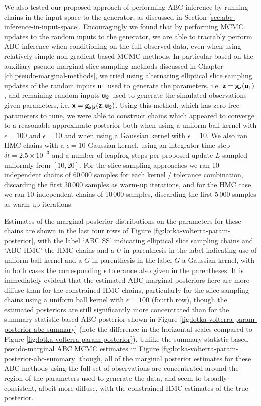 We also tested our proposed approach of performing \ac{ABC} inference by running chains in the input space to the generator, as discussed in Section \ref{sec:abc-inference-in-input-space}. Encouragingly we found that by performing \ac{MCMC} updates to the random inputs to the generator, we are able to tractably perform \ac{ABC} inference when conditioning on the full observed data, even when using relatively simple non-gradient based \ac{MCMC} methods. In particular based on the auxiliary pseudo-marginal slice sampling methods discussed in Chapter \ref{ch:pseudo-marginal-methods}, we tried using alternating elliptical slice sampling updates of the random inputs $\boldsymbol{\mathsf{u}}_1$ used to generate the parameters, i.e. $\boldsymbol{\mathsf{z}} = {\mathbf{g}}_{\boldsymbol{\mathsf{z}}}(\boldsymbol{\mathsf{u}}_1)$, and remaining random inputs $\boldsymbol{\mathsf{u}}_2$ used to generate the simulated observations given parameters, i.e. $\boldsymbol{\mathsf{x}} = {\mathbf{g}}_{\boldsymbol{\mathsf{x}}|\boldsymbol{\mathsf{z}}}(\boldsymbol{\mathsf{z}},\boldsymbol{\mathsf{u}}_2)$. Using this method, which has zero free parameters to tune, we were able to construct chains which appeared to converge to a reasonable approximate posterior both when using a uniform ball kernel with $\epsilon=100$ and $\epsilon=10$ and when using a Gaussian kernel with $\epsilon=10$. We also ran \ac{HMC} chains with a $\epsilon=10$ Gaussian kernel, using an integrator time step $\delta t = 2.5 \times 10^{-3}$ and a number of leapfrog steps per proposed update $L$ sampled uniformly from $[10, 20]$. For the slice sampling approaches we ran 10 independent chains of 60\,000 samples for each kernel / tolerance combination, discarding the first 30\,000 samples as warm-up iterations, and for the \ac{HMC} case we ran 10 independent chains of 10\,000 samples, discarding the first 5\,000 samples as warm-up iterations.

Estimates of the marginal posterior distributions on the parameters for these chains are shown in the last four rows of Figure \ref{fig:lotka-volterra-param-posterior}, with the label `ABC SS' indicating elliptical slice sampling chains and `ABC HMC' the \ac{HMC} chains and a $U$ in parenthesis in the label indicating use of uniform ball kernel and a $G$ in parenthesis in the label $G$ a Gaussian kernel, with in both cases the corresponding $\epsilon$ tolerance also given in the parentheses. It is immediately evident that the estimated \ac{ABC} marginal posteriors here are more diffuse than for the constrained \ac{HMC} chains, particularly for the slice sampling chains using a uniform ball kernel with $\epsilon = 100$ (fourth row), though the estimated posteriors are still significantly more concentrated than for the summary statistic based \ac{ABC} posterior shown in Figure \ref{fig:lotka-volterra-param-posterior-abc-summary} (note the difference in the horizontal scales compared to Figure \ref{fig:lotka-volterra-param-posterior}). Unlike the summary-statistic based pseudo-marginal \ac{ABC} \ac{MCMC} estimates  in Figure \ref{fig:lotka-volterra-param-posterior-abc-summary} though, all of the marginal posterior estimates for these \ac{ABC} methods using the full set of observations are concentrated around the region of the parameters used to generate the data, and seem to broadly consistent, albeit more diffuse, with the constrained \ac{HMC} estimates of the true posterior.

